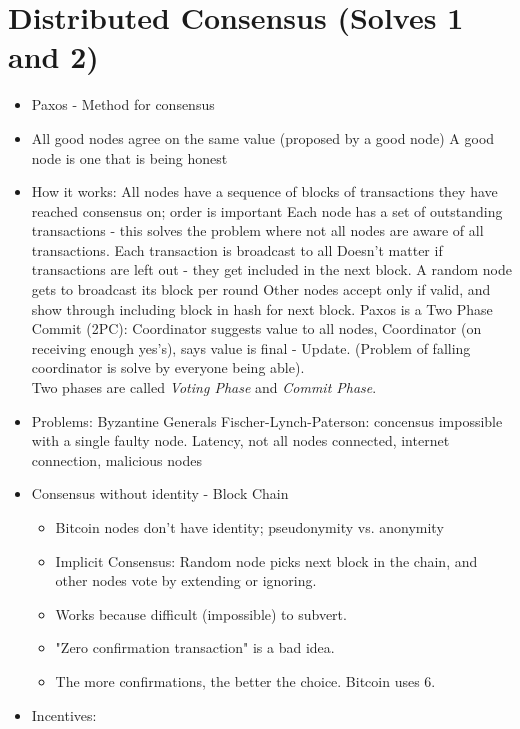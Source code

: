 \documentclass{article}
\begin{document}
\section*{Distributed Consensus (Solves 1 and 2)}
\begin{itemize}
  \item Paxos - Method for consensus
  \item All good nodes agree on the same value (proposed by a good node)
    \subitem A good node is one that is being honest
  \item How it works:
    \subitem All nodes have a sequence of blocks of transactions they have reached consensus on; order is important
    \subitem Each node has a set of outstanding transactions - this solves the problem where not all nodes are aware of all transactions.
    \subitem Each transaction is broadcast to all
    \subitem Doesn't matter if transactions are left out - they get included in the next block.
    \subitem A random node gets to broadcast its block per round
    \subitem Other nodes accept only if valid, and show through including block in hash for next block.
    \subitem Paxos is a Two Phase Commit (2PC): Coordinator suggests value to all nodes, Coordinator (on receiving enough
          yes's), says value is final - Update. (Problem of falling coordinator is solve by everyone being able).\\
          Two phases are called \emph{Voting Phase} and \emph{Commit Phase}.
  \item Problems: 
    \subitem Byzantine Generals
    \subitem Fischer-Lynch-Paterson: concensus impossible with a single faulty node.
    \subitem Latency, not all nodes connected, internet connection, malicious nodes
  \item Consensus without identity - Block Chain
    \begin{itemize}
      \item Bitcoin nodes don't have identity; pseudonymity vs. anonymity
      \item Implicit Consensus: Random node picks next block in the chain, and other nodes vote by extending or ignoring.
      \item Works because difficult (impossible) to subvert.
      \item "Zero confirmation transaction" is a bad idea.
      \item The more confirmations, the better the choice. Bitcoin uses 6.
    \end{itemize}
  \item Incentives:

\end{itemize}
\end{document}
